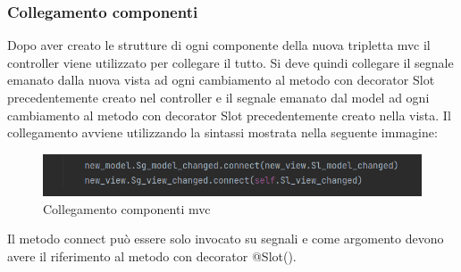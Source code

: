 \subsubsection{Collegamento componenti}
Dopo aver creato le strutture di ogni componente della nuova tripletta mvc il controller viene utilizzato per collegare il tutto. 
Si deve quindi collegare il segnale emanato dalla nuova vista ad ogni cambiamento al metodo con decorator Slot precedentemente creato nel controller e il segnale emanato dal model ad ogni cambiamento al metodo con decorator Slot precedentemente creato nella vista. Il collegamento avviene utilizzando la sintassi mostrata nella seguente immagine:
\begin{figure}[H]
    \centering
    \includegraphics[scale = 0.50]{components/img/collegamento-segnali-mvc.png}
    \caption{Collegamento componenti mvc}
    \label{fig:Collegamento componenti mvc}
\end{figure}
Il metodo connect può essere solo invocato su segnali e come argomento devono avere il riferimento al metodo con decorator @Slot().
